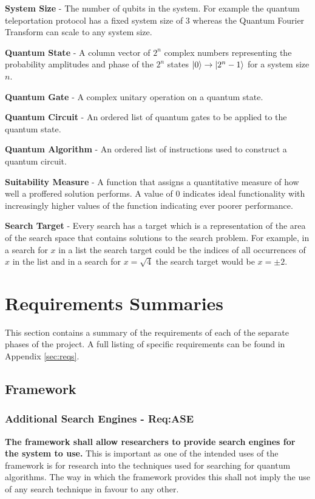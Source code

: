 \textbf{System Size} - The number of qubits in the system. For example the quantum teleportation protocol has a fixed system size of 3 whereas the Quantum Fourier Transform can scale to any system size.

\textbf{Quantum State} - A column vector of $2^n$ complex numbers representing the probability amplitudes and phase of the $2^n$ states $\left\vert{0}\right\rangle\rightarrow\left\vert{2^n-1}\right\rangle$ for a system size $n$.

\textbf{Quantum Gate} - A complex unitary operation on a quantum state.

\textbf{Quantum Circuit} - An ordered list of quantum gates to be applied to the quantum state.

\textbf{Quantum Algorithm} - An ordered list of instructions used to construct a quantum circuit.

\textbf{Suitability Measure} - A function that assigns a quantitative measure of how well a proffered solution performs.
A value of 0 indicates ideal functionality with increasingly higher values of the function indicating ever poorer performance.

\textbf{Search Target} - Every search has a target which is a representation of the area of the search space that contains solutions to the search problem.
For example, in a search for $x$ in a list the search target could be the indices of all occurrences of $x$ in the list and in a search for $x=\sqrt{4}$ the search target would be $x=\pm2$.

\section{Requirements Summaries}
This section contains a summary of the requirements of each of the separate phases of the project.
A full listing of specific requirements can be found in Appendix \ref{sec:reqs}.

\subsection{Framework}
\subsubsection{Additional Search Engines - Req:ASE}
\label{sec:reqase}
\textbf{The framework shall allow researchers to provide search engines for the system to use.}
This is important as one of the intended uses of the framework is for research into the techniques used for searching for quantum algorithms.
The way in which the framework provides this shall not imply the use of any search technique in favour to any other.

